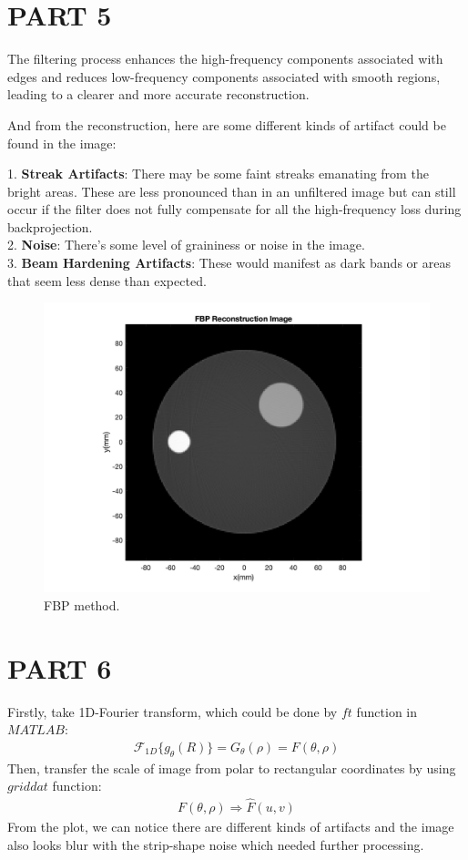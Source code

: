 \documentclass{report}
\begin{document}
\section[short]{PART 5}
The filtering process enhances the high-frequency components associated with 
edges and reduces low-frequency components associated with smooth regions, leading 
to a clearer and more accurate reconstruction.\vspace{\baselineskip}

And from the reconstruction, here are some different kinds of artifact could be
found in the image:\vspace{\baselineskip}

1. \textbf{Streak Artifacts}: There may be some faint streaks emanating from the bright areas.
These are less pronounced than in an unfiltered image but can still occur if the
filter does not fully compensate for all the high-frequency loss during backprojection.\\
2. \textbf{Noise}: There's some level of graininess or noise in the image.\\
3. \textbf{Beam Hardening Artifacts}: These would manifest as dark bands or areas
that seem less dense than expected.

\begin{figure}[hb]
    \centering
    \includegraphics[width=1\textwidth]{5.png}
    \caption{FBP method.}
\end{figure}
\newpage 
\section[short]{PART 6}
Firstly, take 1D-Fourier transform, which could be done by $ft$ function in $MATLAB$:
\begin{align*}
\mathcal{F}_{1D}\{g_{\theta}(R)\} = G_{\theta}(\rho) = F(\theta,\rho)
\end{align*}
Then, transfer the scale of image from polar to rectangular coordinates by using 
$griddat$ function:
\begin{align*}
    F(\theta,\rho) \Rightarrow \hat{F}(u, v)
\end{align*}
From the plot, we can notice there are different kinds of artifacts and the image
also looks blur with the strip-shape noise which needed further processing.\vspace{\baselineskip}
\end{document}
